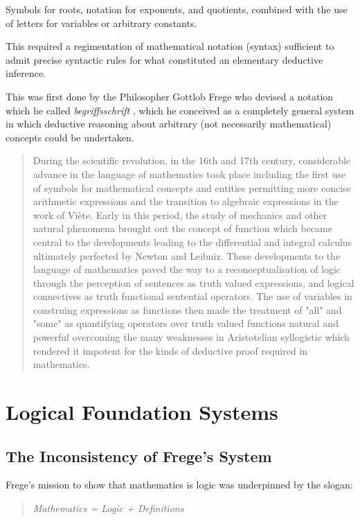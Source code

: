 \documentclass[10pt,titlepage]{book}
\begin{document}
Symbols for roots, notation for exponents, and quotients, combined with the use of letters for variables or arbitrary constants. 


This required a regimentation of mathematical notation (syntax) sufficient to admit precise syntactic rules for what constituted an elementary deductive inference.

This was first done by the Philosopher Gottlob Frege who devised a notation which he called \emph{begriffsschrift} \cite{Frege79}, which he conceived as a completely general system in which deductive reasoning about arbitrary (not necessarily mathematical) concepts could be undertaken.

\begin{quote}
  During the scientific revolution, in the 16th and 17th century, considerable advance in the language of mathematics took place including the first use of symbols for mathematical concepts and entities permitting more concise arithmetic expressions and the transition to algebraic expressions in the work of Viète.
  Early in this period, the study of mechanics and other natural phenomena brought out the concept of function which became central to the developments leading to the differential and integral calculus ultimately perfected by Newton and Leibniz.
  These developments to the language of mathematics paved the way to a reconceptualisation of logic through the perception of sentences as truth valued expressions, and logical connectives as truth functional sentential operators.
  The use of variables in construing expressions as functions then made the treatment of "all" and "some" as quantifying operators over truth valued functions natural and powerful overcoming the many weaknesses in Aristotelian syllogistic which rendered it impotent for the kinds of deductive proof required in mathematics.
\end{quote}

\chapter{Logical Foundation Systems}\label{ChapLFS}

\section{The Inconsistency of Frege's System}

Frege's mission to show that mathematics is logic was underpinned by the slogan:

\begin{quote}
{\it Mathematics = Logic + Definitions}
\end{quote}
\end{document}

